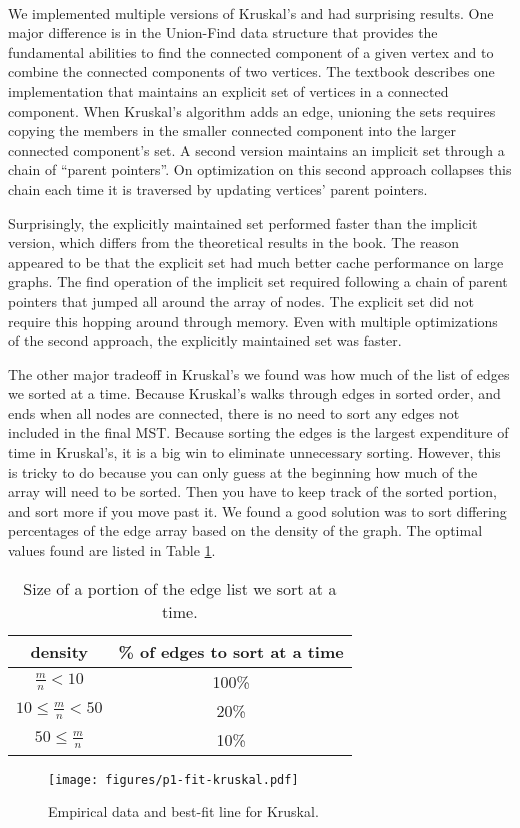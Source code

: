\paragraph{}
We implemented multiple versions of Kruskal's and had surprising
results. One major difference is in the Union-Find data structure that
provides the fundamental abilities to find the connected component of a
given vertex and to combine the connected components of two vertices. The
textbook describes one implementation that maintains an explicit set of
vertices in a connected component. When Kruskal's algorithm adds an edge,
unioning the sets requires copying the members in the smaller connected
component into the larger connected component's set. A second version
maintains an implicit set through a chain of ``parent
pointers''. On optimization on this second approach collapses this chain
each time it is traversed by updating vertices' parent pointers.

Surprisingly, the explicitly maintained set performed faster than the
implicit version, which differs from the theoretical results in the
book. The reason appeared to
be that the explicit set had much better cache performance on large
graphs. The find operation of the
implicit set required following a chain of parent pointers that jumped
all around the array of nodes. The explicit set did not require this
hopping around through memory. Even with multiple optimizations of the
second approach, the explicitly maintained set was faster.

The other major tradeoff in Kruskal's we found was how much of the list of
edges we sorted at a time. Because Kruskal's walks through edges in sorted
order, and ends when all nodes are connected, there is no need to sort any
edges not included in the final MST. Because sorting the edges is the
largest expenditure of time in Kruskal's, it is a big win to eliminate
unnecessary sorting. However, this is tricky to do because you can only
guess at the beginning how much of the array will need to be sorted. Then
you have to keep track of the sorted portion, and sort more if you move
past it. We found a good solution was to sort differing percentages of the
edge array based on the density of the graph. The optimal values found are
listed in Table \ref{table:kruskal-sort-percent}.

\begin{table}
\begin{tabular}{|c|c|}
\hline
density&\% of edges to sort at a time\\
\hline
$\frac{m}{n} < 10$& 100\% \\
$10 \leq \frac{m}{n} < 50$& 20\% \\
$50 \leq \frac{m}{n}$& 10\% \\
\hline
\end{tabular}
\caption{Size of a portion of the edge list we sort at a time.}
\label{table:kruskal-sort-percent}
\end{table}

\begin{figure}[htb]
\centering
\texttt{[image: figures/p1-fit-kruskal.pdf]}
\caption{Empirical data and best-fit line for Kruskal.}
\label{fig:p1-fit-kruskal}
\end{figure}
